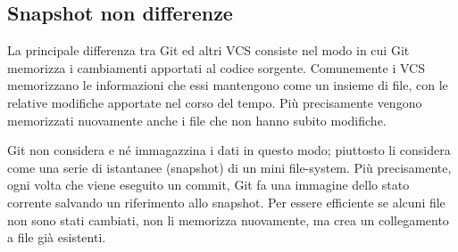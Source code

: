 \subsection{Snapshot non differenze}
La principale differenza tra Git ed altri VCS consiste nel modo in cui Git memorizza i cambiamenti apportati al codice sorgente. Comunemente i VCS memorizzano le informazioni che essi mantengono come un insieme di file, con le relative modifiche apportate nel corso del tempo. Più precisamente vengono memorizzati nuovamente anche i file che non hanno subito modifiche.

Git non considera e né immagazzina i dati in questo modo; piuttosto li considera come una serie di istantanee (snapshot) di un mini file-system. Più precisamente, ogni volta che viene eseguito un commit, Git fa una immagine dello stato corrente salvando un riferimento allo snapshot. Per essere efficiente se alcuni file non sono stati cambiati, non li memorizza nuovamente, ma crea un collegamento a file già esistenti.